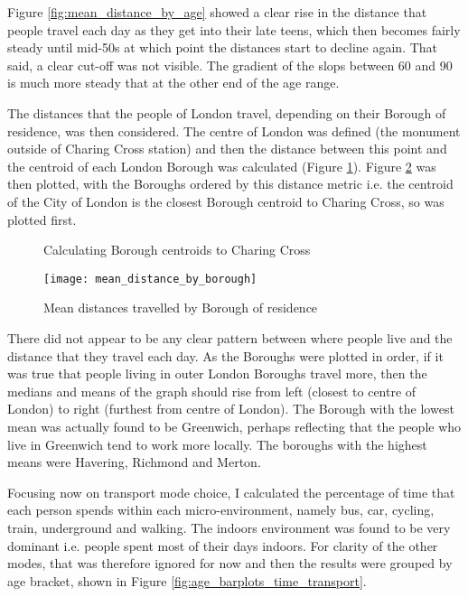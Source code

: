 Figure \ref{fig:mean_distance_by_age} showed a clear rise in the distance that people travel each day as they get into their late teens, which then becomes fairly steady until mid-50s at which point the distances start to decline again. That said, a clear cut-off was not visible. The gradient of the slops between 60 and 90 is much more steady that at the other end of the age range.

The distances that the people of London travel, depending on their Borough of residence, was then considered. The centre of London was defined (the monument outside of Charing Cross station) and then the distance between this point and the centroid of each London Borough was calculated (Figure \ref{fig:borough_centroids}). Figure \ref{fig:mean_distance_by_borough} was then plotted, with the Boroughs ordered by this distance metric i.e. the centroid of the City of London is the closest Borough centroid to Charing Cross, so was plotted first.

\begin{figure}[H]
\centering
{}
\caption{Calculating Borough centroids to Charing Cross}
\label{fig:borough_centroids}
\end{figure}

\begin{landscape}

\begin{figure}[H]
\centering
\texttt{[image: mean\_distance\_by\_borough]}
\caption{Mean distances travelled by Borough of residence}
\label{fig:mean_distance_by_borough}
\end{figure}

\end{landscape}

There did not appear to be any clear pattern between where people live and the distance that they travel each day. As the Boroughs were plotted in order, if it was true that people living in outer London Boroughs travel more, then the medians and means of the graph should rise from left (closest to centre of London) to right (furthest from centre of London). The Borough with the lowest mean was actually found to be Greenwich, perhaps reflecting that the people who live in Greenwich tend to work more locally. The boroughs with the highest means were Havering, Richmond and Merton.

Focusing now on transport mode choice, I calculated the percentage of time that each person spends within each micro-environment, namely bus, car, cycling, train, underground and walking. The indoors environment was found to be very dominant i.e. people spent most of their days indoors. For clarity of the other modes, that was therefore ignored for now and then the results were grouped by age bracket, shown in Figure \ref{fig:age_barplots_time_transport}.

